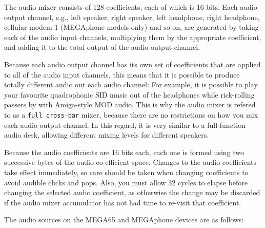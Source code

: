 \begin{enumerate}
The audio mixer consists of 128 coefficients, each of which is 16
bits.  Each audio output channel, e.g., left speaker, right speaker,
left headphone, right headphone, cellular modem 1 (MEGAphone models
only) and so on, are generated by taking each of the audio input
channels, multiplying them by the appropriate coefficient, and adding
it to the total output of the audio output channel.

Because each
audio output channel has its own set of coefficients that are applied
to all of the audio input channels, this means that it is possible to
produce totally different audio out each audio channel: For example,
it is possible to play your favourite quadrophonic SID music out of
the headphones while rick-rolling passers by with Amiga-style MOD
audio.  This is why the audio mixer is refered to as a {\tt full
  cross-bar} mixer, because there are no restrictions on how you mix
each audio output channel.  In this regard, it is very similar to a
full-function audio desk, allowing different mixing levels for
different speakers.

Because the audio coefficients are 16 bits each, each one is formed
using two successive bytes of the audio co-efficient space.  Changes
to the audio coefficients take effect immediately, so care should be
taken when changing coefficients to avoid audible clicks and pops.
Also, you must allow 32 cycles to elapse before changing the selected
audio coefficient, as otherwise the change may be discarded if the
audio mixer accumulator has not had time to re-visit that coefficient.

The audio sources on the MEGA65 and MEGAphone devices are as follows:


\end{enumerate}
